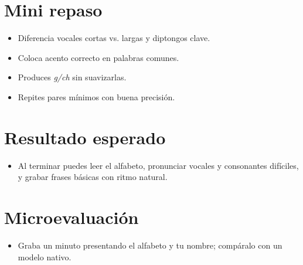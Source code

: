 \section{Mini repaso}
\begin{itemize}[leftmargin=*]
	\item Diferencia vocales cortas vs. largas y diptongos clave.
	\item Coloca acento correcto en palabras comunes.
	\item Produces \textit{g/ch} sin suavizarlas.
	\item Repites pares mínimos con buena precisión.
\end{itemize}

\section{Resultado esperado}
\begin{itemize}[leftmargin=*]
	\item Al terminar puedes leer el alfabeto, pronunciar vocales y consonantes difíciles, y grabar frases básicas con ritmo natural.
\end{itemize}

\section{Microevaluación}
\begin{itemize}[leftmargin=*]
	\item Graba un minuto presentando el alfabeto y tu nombre; compáralo con un modelo nativo.
\end{itemize}
